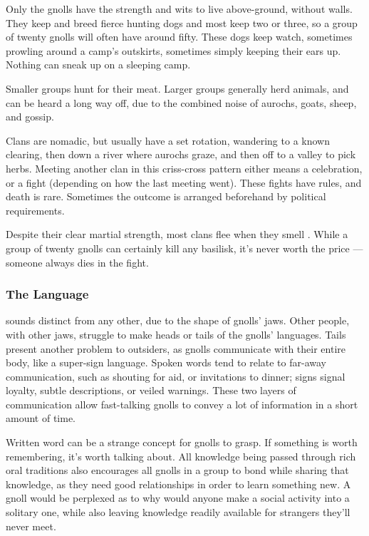 \label{GnollishGrounds}

\renewcommand\npcsymbol{\Nl}

\noindent
Only the gnolls have the strength and wits to live above-ground, without walls.
They keep and breed fierce hunting dogs and most keep two or three, so a group of twenty gnolls will often have around fifty.
These dogs keep watch, sometimes prowling around a camp's outskirts, sometimes simply keeping their ears up.
Nothing can sneak up on a sleeping camp.

Smaller groups hunt for their meat.
Larger groups generally herd animals, and can be heard a long way off, due to the combined noise of aurochs, goats, sheep, and gossip.

Clans are nomadic, but usually have a set rotation, wandering to a known clearing, then down a river where aurochs graze, and then off to a valley to pick herbs.
Meeting another clan in this criss-cross pattern either means a celebration, or a fight (depending on how the last meeting went).
These fights have rules, and death is rare.
Sometimes the outcome is arranged beforehand by political requirements.

Despite their clear martial strength, most clans flee when they smell .
While a group of twenty gnolls can certainly kill any \gls{basilisk}, it's never worth the price --- someone always dies in the fight.

\subsubsection[The Gnollish Language]{The Language}
\label{gnollishLanguage}
sounds distinct from any other, due to the shape of gnolls' jaws.
Other people, with other jaws, struggle to make heads or tails of the gnolls' languages.
Tails present another problem to outsiders, as gnolls communicate with their entire body, like a super-sign language.
Spoken words tend to relate to far-away communication, such as shouting for aid, or invitations to dinner; signs signal loyalty, subtle descriptions, or veiled warnings. These two layers of communication allow fast-talking gnolls to convey a lot of information in a short amount of time.

Written word can be a strange concept for gnolls to grasp. If something is worth remembering, it's worth talking about. All knowledge being passed through rich oral traditions also encourages all gnolls in a group to bond while sharing that knowledge, as they need good relationships in order to learn something new. A gnoll would be perplexed as to why would anyone make a social activity into a solitary one, while also leaving knowledge readily available for strangers they'll never meet.

